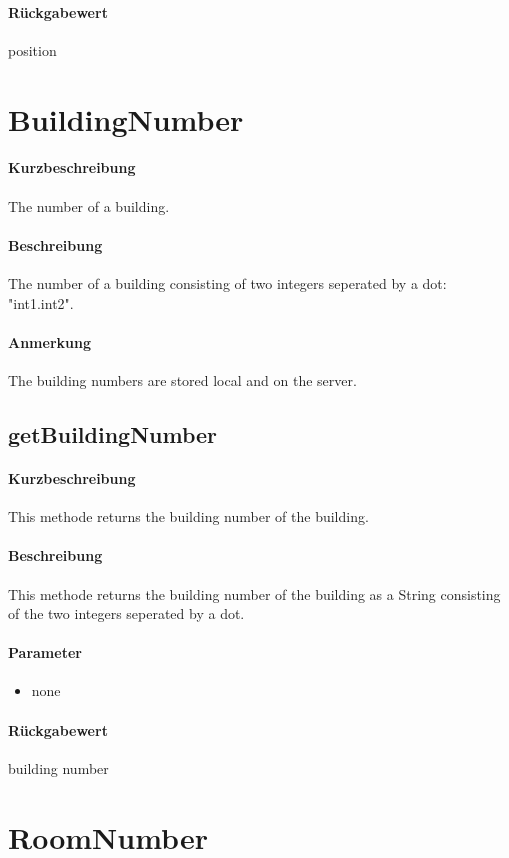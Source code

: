 \paragraph*{Rückgabewert}
position


\section{BuildingNumber}
\paragraph*{Kurzbeschreibung}
The number of a building.
\paragraph*{Beschreibung}
The number of a building consisting of two integers seperated by a dot: "int1.int2".
\paragraph*{Anmerkung}
The building numbers are stored local and on the server.

\subsection{getBuildingNumber}%
\paragraph*{Kurzbeschreibung}
This methode returns the building number of the building.
\paragraph*{Beschreibung}
This methode returns the building number of the building as a String consisting of the two integers seperated by a dot.
\paragraph*{Parameter}
\begin{itemize}
    \item none
\end{itemize}
\paragraph*{Rückgabewert}
building number


\section{RoomNumber}
